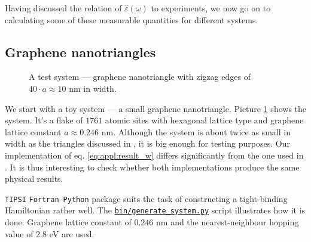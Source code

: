 \documentclass[a4paper,12pt]{article}
\begin{document}
    Having discussed the relation of $\hat\varepsilon(\omega)$ to experiments, we now go on to calculating some of these measurable quantities for different systems.

\newpage
\subsection{Graphene nanotriangles}
\label{sec:nanotriangles}
    \begin{figure}
        \center
        \vspace{-1.3cm}
        
        \captionsetup{width=0.4\textwidth, skip=10pt}
        \caption{A test system --- graphene nanotriangle with zigzag edges of $40\cdot a \approx 10$ nm in width.}
        \label{fig:coordinates-ZigZag-40}
    \end{figure}
    We start with a toy system --- a small graphene nanotriangle. Picture \ref{fig:coordinates-ZigZag-40} shows the system. It's a flake of $1761$ atomic sites with hexagonal lattice type and graphene lattice constant $a \approx 0.246$ nm. Although the system is about twice as small in width as the triangles discussed in \cite{plasmonic2015}, it is big enough for testing purposes. Our implementation of eq. \eqref{eq:appl:result_w} differs significantly from the one used in \cite{plasmonic2015}. It is thus interesting to check whether both implementations produce the same physical results.

    \texttt{TIPSI} \texttt{Fortran}--\texttt{Python} package \cite{tipsi} suits the task of constructing a tight-binding Hamiltonian rather well. The \href{https://github.com/twesterhout/plasmon-cpp/blob/master/bin/generate\_system.py}{\texttt{bin/generate\_system.py}} script illustrates how it is done. Graphene lattice constant of $0.246$ nm and the nearest-neighbour hopping value of $2.8$ eV are used.

    \begin{figure}[h]
    \vspace{-0.3cm}
    \begin{minipage}{\textwidth}
        
        \captionsetup{skip=5pt}
        \label{fig:spectrum-ZigZag-40}
    \end{minipage}
    \begin{minipage}{\textwidth}
        \vspace{-1.0cm}
        
        \captionsetup{skip=0pt}
        \label{fig:eigenmodes-ZigZag-40}
    \end{minipage}
    \end{figure}
\end{document}
